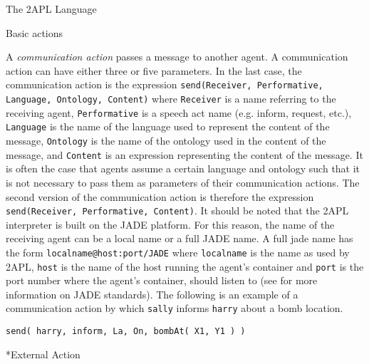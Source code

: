 \begin{chapter}{The 2APL Language}
\begin{section}{Basic actions}
\begin{subsection}
A \emph{communication action} passes a message to another agent. A
communication action  can have either three or five
parameters. In the last case, the communication action is the
expression {\tt send(Receiver, Performative, Language, Ontology,
Content)} where {\tt Receiver} is a name referring to the receiving
agent, {\tt Performative} is a speech act name (e.g. inform,
request, etc.), {\tt Language} is the name of the language used to
represent the content of the message, {\tt Ontology} is the name of
the ontology used in the content of the message, and {\tt Content}
is an expression representing the content of the message. It is
often the case that agents assume a certain language and ontology
such that it is not necessary to pass them as parameters of their
communication actions. The second version of the communication
action is therefore the expression {\tt send(Receiver, Performative,
Content)}. It should be noted that the 2APL interpreter is built on
the JADE platform. For this reason, the name of the receiving agent
can be a local name or a full JADE name. A full jade name has the
form {\tt localname@host:port/JADE} where {\tt localname} is the
name as used by 2APL, {\tt host} is the name of the host running the
agent's container and {\tt port} is the port number where the
agent's container, should listen to (see \cite{jade2005} for more
information on JADE standards). The following is an example of a
communication action by which {\tt sally} informs {\tt harry} about
a bomb location.

\begin{verbatim}
send( harry, inform, La, On, bombAt( X1, Y1 ) )
\end{verbatim}

\end{subsection}


\begin{subsection}*{External Action}\label{sec:externalaction}


\end{subsection}
\end{section}
\end{chapter}
